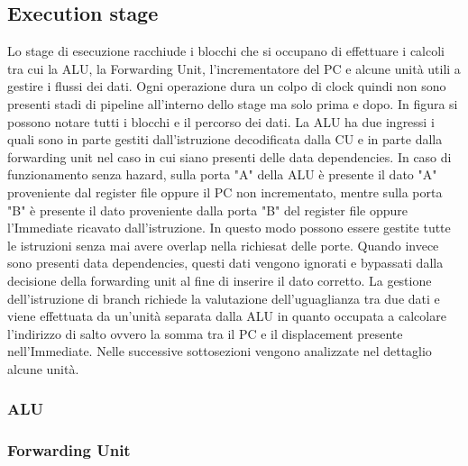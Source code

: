 \subsection{Execution stage}
Lo stage di esecuzione racchiude i blocchi che si occupano di effettuare i calcoli tra cui la ALU, la Forwarding Unit, l'incrementatore del PC e alcune unità utili a gestire i flussi dei dati. Ogni operazione dura un colpo di clock quindi non sono presenti stadi di pipeline all'interno dello stage ma solo prima e dopo. In figura  si possono notare tutti i blocchi e il percorso dei dati. La ALU ha due ingressi i quali sono in parte gestiti dall'istruzione decodificata dalla CU e in parte dalla forwarding unit nel caso in cui siano presenti delle data dependencies. In caso di funzionamento senza hazard, sulla porta "A" della ALU è presente il dato "A" proveniente dal register file oppure il PC non incrementato, mentre sulla porta "B" è presente il dato proveniente dalla porta "B" del register file oppure l'Immediate ricavato dall'istruzione. In questo modo possono essere gestite tutte le istruzioni senza mai avere overlap nella richiesat delle porte. Quando invece sono presenti data dependencies, questi dati vengono ignorati e bypassati dalla decisione della forwarding unit al fine di inserire il dato corretto. La gestione dell'istruzione di branch richiede la valutazione dell'uguaglianza tra due dati e viene effettuata da un'unità separata dalla ALU in quanto occupata a calcolare l'indirizzo di salto ovvero la somma tra il PC e il displacement presente nell'Immediate. Nelle successive sottosezioni vengono analizzate nel dettaglio alcune unità.

\subsubsection{ALU}

\subsubsection{Forwarding Unit}
